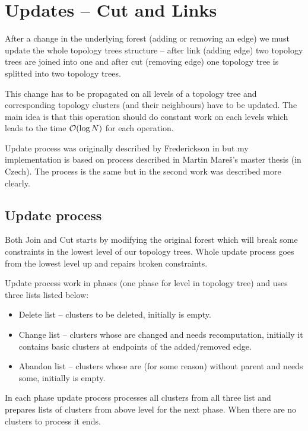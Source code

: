 \section{Updates -- Cut and Links}

After a change in the underlying forest (adding or removing an edge) we must
update the whole topology trees structure -- after link (adding edge) two
topology trees are joined into one and after cut (removing edge) one topology
tree is splitted into two topology trees.

This change has to be propagated on all levels of a topology tree and
corresponding topology clusters (and their neighbours) have to be updated. The
main idea is that this operation should do constant work on each levels which
leads to the time ${\cal O}(\log N)$ for each operation.

Update process was originally described by Frederickson in
\cite{DSforDynamicallyMaintainingRootedTrees} but my implementation is based on
process described in Martin Mareš's master thesis \cite{DGA} (in Czech). The
process is the same but in the second work was described more clearly.

\subsection{Update process}

Both Join and Cut starts by modifying the original forest which will break some
constraints in the lowest level of our topology trees. Whole update process
goes from the lowest level up and repairs broken constraints.

Update process work in phases (one phase for level in topology tree) and uses
three lists listed below:
\begin{itemize}
\item Delete list -- clusters to be deleted, initially is empty.
\item Change list -- clusters whose are changed and needs recomputation, initially
it contains basic clusters at endpoints of the added/removed edge.
\item Abandon list -- clusters whose are (for some reason) without parent and
needs some, initially is empty.
\end{itemize}

In each phase update process processes all clusters from all three list and
prepares lists of clusters from above level for the next phase. When there are
no clusters to process it ends.

